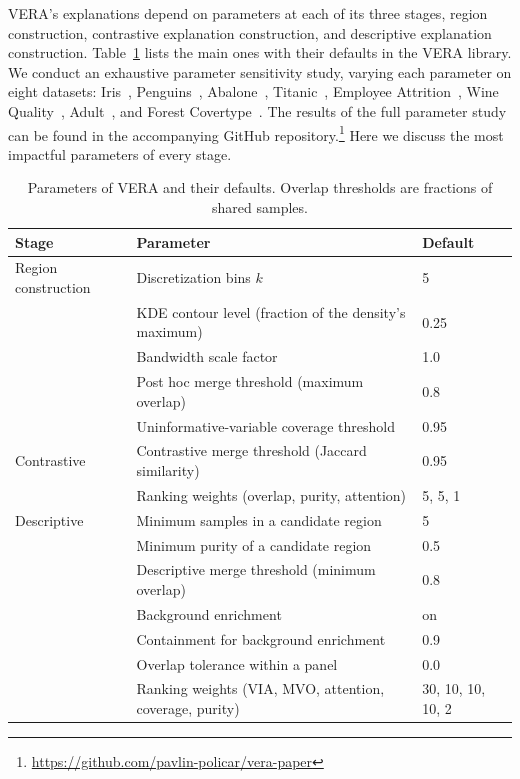 \documentclass[10pt]{article}
\begin{document}
VERA's explanations depend on parameters at each of its three stages, region construction, contrastive explanation construction, and descriptive explanation construction.
Table~\ref{tab:supp-parameters} lists the main ones with their defaults in the VERA library.
We conduct an exhaustive parameter sensitivity study, varying each parameter on eight datasets: Iris~\cite{Anderson1936}, Penguins~\cite{Horst2020}, Abalone~\cite{Nash1994}, Titanic~\cite{Dawson1995}, Employee Attrition~\cite{IbmEmployeeAttrition}, Wine Quality~\cite{Cortez2009}, Adult~\cite{Becker1996}, and Forest Covertype~\cite{Blackard1998}.
The results of the full parameter study can be found in the accompanying GitHub repository.\footnote{\url{https://github.com/pavlin-policar/vera-paper}}
Here we discuss the most impactful parameters of every stage.

\begin{table}[htbp]
  \centering\small
  \caption{Parameters of VERA and their defaults. Overlap thresholds are fractions of shared samples.}
  \label{tab:supp-parameters}
  \begin{tabular}{lll}
    \toprule
    Stage & Parameter & Default \\
    \midrule
    Region construction & Discretization bins $k$ & 5 \\
    & KDE contour level (fraction of the density's maximum) & 0.25 \\
    & Bandwidth scale factor & 1.0 \\
    & Post hoc merge threshold (maximum overlap) & 0.8 \\
    & Uninformative-variable coverage threshold & 0.95 \\
    Contrastive & Contrastive merge threshold (Jaccard similarity) & 0.95 \\
    & Ranking weights (overlap, purity, attention) & 5, 5, 1 \\
    Descriptive & Minimum samples in a candidate region & 5 \\
    & Minimum purity of a candidate region & 0.5 \\
    & Descriptive merge threshold (minimum overlap) & 0.8 \\
    & Background enrichment & on \\
    & Containment for background enrichment & 0.9 \\
    & Overlap tolerance within a panel & 0.0 \\
    & Ranking weights (VIA, MVO, attention, coverage, purity) & 30, 10, 10, 10, 2 \\
    \bottomrule
  \end{tabular}
\end{table}
\end{document}
